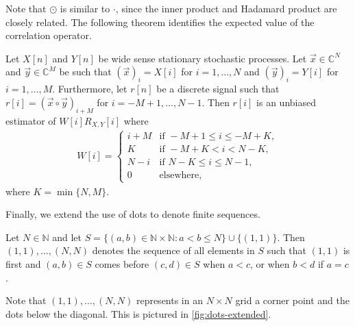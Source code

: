 \documentclass[a4paper, openany, oneside]{memoir}
\begin{document}
Note that $\odot$ is similar to $\cdot$, since the inner product and Hadamard product are closely related.
The following theorem identifies the expected value of the correlation operator.

\begin{blockTheorem} 
    Let $X[n]$ and $Y[n]$ be wide sense stationary stochastic processes. Let $\vec{x} \in \mathbb{C}^N$ and $\vec{y} \in \mathbb{C}^M$ be such that $(\vec{x})_i = X[i]$ for $i=1,\ldots,N$ and $(\vec{y})_i = Y[i]$ for $i=1,\ldots,M$. Furthermore, let $r[n]$ be a discrete signal such that $r[i] = (\vec{x} \circ \vec{y})_{i+M}$ for $i = -M+1,\ldots,N-1$. Then $r[i]$ is an unbiased estimator of $W[i]R_{X,Y}[i]$ where
    \begin{align*}
        W[i] = \begin{cases}
            i + M & \text{if } -M + 1 \le i \le -M + K, \\
            K & \text{if } -M + K < i < N - K, \\
            N - i & \text{if } N - K \le i \le N - 1, \\
            0 & \text{elsewhere,}
        \end{cases}
    \end{align*}
    where $K = \min\{N,M\}$.
\end{blockTheorem}

Finally, we extend the use of dots to denote finite sequences.

\begin{blockDefinition} 
    Let $N \in \mathbb{N}$ and let $S=\{(a,b) \in \mathbb{N} \times \mathbb{N} : a < b \le N\}\cup \{(1,1)\}$. Then $(1,1),\ldots,(N,N)$ denotes the sequence of all elements in $S$ such that $(1,1)$ is first and $(a,b) \in S$ comes before $(c,d) \in S$ when $a < c$, or when $b < d$ if $a = c$.
\end{blockDefinition}

Note that $(1,1),\ldots,(N,N)$ represents in an $N \times N$ grid a corner point and the dots below the diagonal. This is pictured in \cref{fig:dots-extended}.
\end{document}
